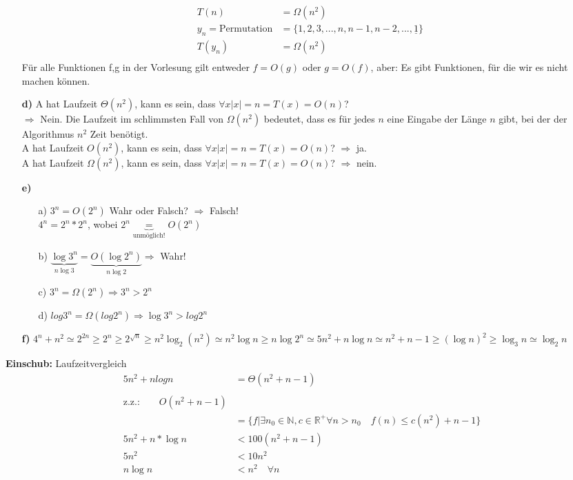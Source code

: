 \documentclass[ngerman,a4paper]{report}
\begin{document}
\begin{enumerate}
\begin{align*}
	T(n) &= \Omega (n^2)\\
	y_n = \text{Permutation} &= \{1, 2, 3, ..., n, n-1, n-2, ..., \underline{1}\}\\
	T(y_n) &= \Omega(n^2)\\
	\end{align*}
	Für alle Funktionen f,g in der Vorlesung gilt entweder $f = O(g)$ oder $g = O(f)$, aber: Es gibt Funktionen, für die wir es nicht machen können.\\
\item[\textbf{d)}] A hat Laufzeit $\Theta (n^2)$, kann es sein, dass $\forall x |x|=n = T(x) = O(n)$?\\
	$\Rightarrow$ Nein. Die Laufzeit im schlimmsten Fall von $\Omega (n^2)$ bedeutet, dass es für jedes $n$ eine Eingabe der Länge $n$ gibt, bei der der Algorithmus $n^2$ Zeit benötigt.\\
	A hat Laufzeit $O(n^2)$, kann es sein, dass $\forall x |x|=n = T(x) = O(n)$?
	$\Rightarrow$ ja.\\
	A hat Laufzeit $\Omega (n^2)$, kann es sein, dass $\forall x |x|=n = T(x) = O(n)$?
	$\Rightarrow$ nein.\\
\item[\textbf{e)}]
	\begin{enumerate}
	\item[a)] $3^n = O(2^n)$ Wahr oder Falsch? $\Rightarrow$ Falsch!\\
	$4^n = 2^n * 2^n$, wobei $2^n \underbrace{=}_\text{unmöglich!} O(2^n)$\\
	\item[b)] $\underbrace{\log 3^n}_{n \log 3} = \underbrace{O(\log 2^n)}_{n \log 2} \Rightarrow $ Wahr!\\
	\item[c)] $3^n = \Omega(2^n) \Rightarrow 3^n > 2^n$\\
	\item[d)] $log 3^n = \Omega (log 2^n) \Rightarrow \log 3^n > log 2^n$\\ 
	\end{enumerate}
\item[\textbf{f)}] $4^n + n^2 \simeq 2^{2n} \geq 2^n \geq 2^{\sqrt{n}} \geq n^2 \log_2(n^2) \simeq n^2 \log n \geq n \log 2^n \simeq 5n^2 + n \log n \simeq n^2 + n-1 \geq (\log n)^2 \geq \log_3 n \simeq \log_2 n$\\ 
\end{enumerate}

\textbf{Einschub: }Laufzeitvergleich\\
\begin{align*}
5n^2 + n log n &= \Theta (n^2 + n -1)\\
\\
\text{z.z.:} \quad \quad O(n^2 +n-1)\\
&= \{f | \exists n_0 \in \mathbb{N}, c \in \mathbb{R}^+ \forall n > n_0 \quad f(n)\leq c(n^2)+n-1\}\\
5n^2 + n* \log n &< 100(n^2 + n-1)\\
5 n^2 &< 10n^2\\
n \log n &< n^2 \quad \forall n\\
\end{align*}
\end{document}
